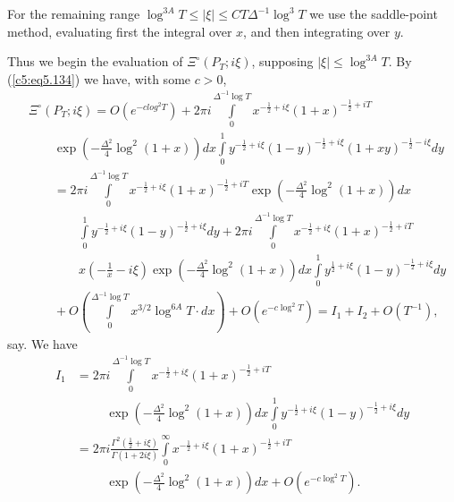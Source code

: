 For the remaining range $\log^{3A} T \leq |\xi| \leq CT\Delta^{-1}
\log^3 T$ we use the saddle-point method, evaluating first the
integral over $x$, and then integrating over $y$. 

Thus we begin the evaluation of $\Xi^\circ (P_T;i\xi)$, supposing
$|\xi| \leq \log^{3A} T$. By (\ref{c5:eq5.134}) we have, with some
$c>0$, 
\begin{align*}
& \Xi^\circ (P_T ; i\xi) = O (e^{-clog^2 T}) + 
2 \pi i \int\limits^{\Delta^{-1} \log T}_0 x^{-\frac{1}{2} + i \xi}
(1+x)^{-\frac{1}{2} + iT} \\ 
& \qquad \exp \left(-\frac{\Delta^2}{4} \log^2 (1+x) \right) dx
\int\limits^1_0 y^{-\frac{1}{2} + i \xi} (1-y)^{-\frac{1}{2} + i \xi}
(1+xy)^{-\frac{1}{2} - i \xi} dy \\ 
& \qquad = 2 \pi i \int\limits^{\Delta^{-1} \log T}_0 x^{-\frac{1}{2}
  + i\xi } (1+x)^{-\frac{1}{2} + iT} \exp \left(-\frac{\Delta^2}{4}
\log^2 (1+x) \right) dx \\ 
& \qquad \qquad \int\limits^1_0 y^{-\frac{1}{2} + i \xi}
(1-y)^{-\frac{1}{2} + i\xi} dy +  
 2 \pi i \int\limits^{\Delta^{-1} \log T}_0 x^{-\frac{1}{2} + i\xi}
 (1+x)^{-\frac{1}{2} + iT} \\ 
& \qquad \qquad x \left(-\frac{1}{x} - i \xi \right) \exp
 \left(-\frac{\Delta^2}{4} \log^2 (1+x) \right) dx \int\limits^1_0
 y^{\frac{1}{2} + i \xi} (1-y)^{-\frac{1}{2} + i  \xi} dy\\ 
& \qquad + O \left(\int\limits^{\Delta^{-1} \log T}_0 x^{3/2}
 \log^{6A} T \cdot dx \right) + O (e^{-c\log^2 T }) = I_1 + I_2 +
 O(T^{-1}) , 
\end{align*}
say. We have
\begin{align*}
  I_1 & = 2 \pi i \int\limits^{\Delta^{-1} \log T}_0 x^{-\frac{1}{2} +
    i \xi} (1+x)^{-\frac{1}{2} + iT} \\ 
& \hspace{1cm} \exp \left(-\frac{\Delta^2}{4} \log^2 (1+x) \right) dx
  \int\limits^1_0 y^{-\frac{1}{2} + i \xi} (1-y)^{-\frac{1}{2}+ i \xi}
  dy\\ 
& = 2 \pi i  \frac{\Gamma^2 (\frac{1}{2} + i \xi)}{\Gamma(1+2i\xi)}
  \int\limits^\infty_0 x^{-\frac{1}{2} + i \xi} (1+x)^{-\frac{1}{2} +
    iT} \\ 
& \hspace{1cm}  \exp \left(-\frac{\Delta^2}{4} \log^2 (1+x)\right) dx
  + O(e^{-c\log^2 T}). 
\end{align*}\pageoriginale

